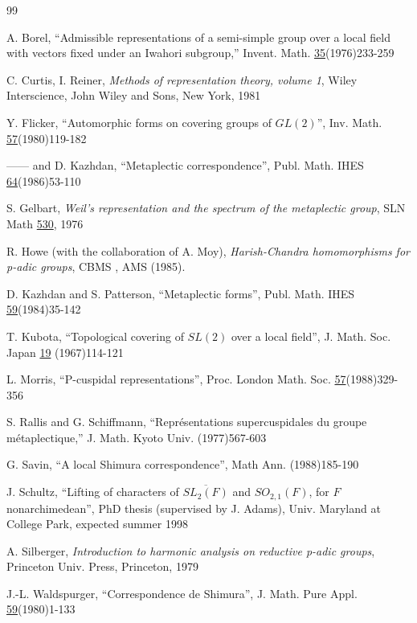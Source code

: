 \documentclass[12pt,letterpaper]{amsart}
\theoremstyle{definition}
\theoremstyle{remark}
\begin{document}
\begin{thebibliography}{99}

 A. Borel, ``Admissible representations of 
a semi-simple group
over a local field with vectors fixed under an Iwahori 
subgroup,'' Invent. Math. \underline{35}(1976)233-259

 C. Curtis, I. Reiner, {\it Methods 
of representation theory, volume 1}, Wiley Interscience, 
John Wiley and Sons,
New York, 1981

 Y. Flicker, ``Automorphic forms on covering groups of 
$GL(2)$'', Inv. Math. \underline{57}(1980)119-182

 ------ and D. Kazhdan, ``Metaplectic 
correspondence'', Publ. Math. IHES \underline{64}(1986)53-110

 S. Gelbart, {\it Weil's representation and 
the spectrum of the metaplectic group},
SLN Math \underline{530}, 1976

 R. Howe (with the collaboration of A. Moy),
{\it Harish-Chandra homomorphisms for p-adic groups}, 
CBMS , AMS (1985).


 D. Kazhdan and  S. Patterson, ``Metaplectic forms'', 
Publ. Math. IHES \underline{59}(1984)35-142

 T. Kubota, ``Topological covering of $SL(2)$ over a 
local field'', J.
Math. Soc. Japan \underline{19} (1967)114-121


 L. Morris, ``P-cuspidal representations'', 
Proc. London Math. Soc. \underline{57}(1988)329-356

 S. Rallis and G. Schiffmann,
``Repr\'esentations supercuspidales du
groupe m\'etaplectique,'' J. Math. Kyoto
Univ. (1977)567-603

 G. Savin, ``A local Shimura correspondence'',
Math Ann. (1988)185-190

 J. Schultz, ``Lifting of characters of 
$\overline{SL_2(F)}$ and
$SO_{2,1}(F)$, for $F$ nonarchimedean'',
PhD thesis (supervised by J. Adams),
Univ. Maryland at College Park, expected summer 1998

 A. Silberger, {\it Introduction to
harmonic analysis on reductive p-adic groups}, Princeton Univ. 
Press, Princeton, 1979

 J.-L. Waldspurger, ``Correspondence de Shimura'',
J. Math. Pure Appl. \underline{59}(1980)1-133
\end{thebibliography}
\end{document}
